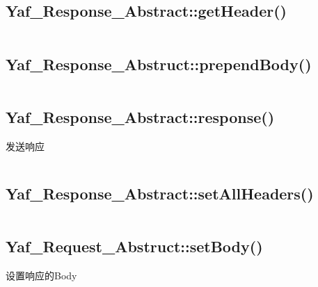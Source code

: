 \subsection{Yaf\_Response\_Abstract::getHeader()}

\begin{lstlisting}[language=PHP]

\end{lstlisting}



\subsection{Yaf\_Response\_Abstruct::prependBody()}



\begin{lstlisting}[language=PHP]

\end{lstlisting}

\subsection{Yaf\_Response\_Abstract::response()}

发送响应


\begin{lstlisting}[language=PHP]

\end{lstlisting}

\subsection{Yaf\_Response\_Abstract::setAllHeaders()}





\begin{lstlisting}[language=PHP]

\end{lstlisting}


\subsection{Yaf\_Request\_Abstruct::setBody()}

设置响应的Body



\begin{lstlisting}[language=PHP]

\end{lstlisting}


